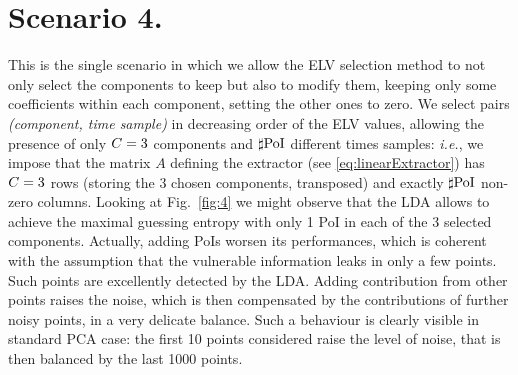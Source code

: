 \section{Scenario 4.}


This is the single scenario in which we allow the ELV selection method to not only select the components to keep but also to modify them, keeping only some coefficients within each component, setting the other ones to zero. We select pairs \textit{(component, time sample)} in decreasing order of the ELV values, allowing the presence of only $C = 3$ components and $\sharp\mathrm{PoI}$ different times samples: {\em i.e.}, we impose that the matrix $A$ defining the extractor (see \eqref{eq:linearExtractor}) has $C = 3$ rows (storing the 3 chosen components, transposed) and exactly $\sharp\mathrm{PoI}$ non-zero columns.
Looking at Fig.~\ref{fig:4} we might observe that the LDA allows to achieve the maximal guessing entropy with only 1 PoI in each of the 3 selected components. 
Actually, adding PoIs worsen its performances, which is coherent with the assumption that the vulnerable information leaks in only a few points. Such points are excellently detected by the LDA. Adding contribution from other points raises the noise, which is then compensated by the contributions of further noisy points, in a very delicate balance. Such a behaviour is clearly visible in standard PCA case: the first 10 points considered raise the level of noise, that is then balanced by the last 1000 points.

